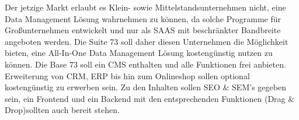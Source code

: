 	Der jetzige Markt erlaubt es Klein- sowie Mittelstandsunternehmen nicht, eine Data Management Lösung wahrnehmen zu können, da solche Programme für Großunternehmen entwickelt und nur als SAAS mit beschränkter Bandbreite angeboten werden.
	Die Suite 73 soll daher diesen Unternehmen die Möglichkeit bieten, eine All-In-One Data Management Lösung kostengünstig nutzen zu können.
	Die Base 73 soll ein CMS enthalten und alle Funktionen frei anbieten. Erweiterung von CRM, ERP bis hin zum Onlineshop sollen optional kostengünstig zu erwerben sein.
	Zu den Inhalten sollen SEO \& SEM's gegeben sein, ein Frontend und ein Backend  mit den entsprechenden Funktionen (Drag \& Drop)sollten auch bereit stehen.